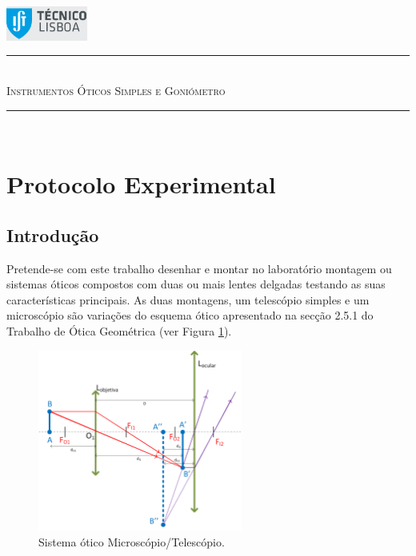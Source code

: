 \documentclass[a4paper,12pt]{article}      %
\author{Prof. Bernardo B. Carvalho}
\date{ Outubro 2012}
\newcommand{\HRule}{\rule{\linewidth}{0.5mm}}
\begin{document}
 

	\includegraphics[width=0.2\textwidth]{../logo-ist}%

	\HRule \\[0.5cm]
	{ \huge \sf  \textsc{Instrumentos Óticos Simples e Goniómetro}} \\[0.4cm] %
	\HRule \\%

\section{\sf Protocolo Experimental}
\subsection{\sf Introdução}
Pretende-se com este trabalho desenhar e montar no laboratório montagem ou sistemas óticos compostos com duas ou mais lentes delgadas testando as suas características principais. As duas montagens, um telescópio simples e um microscópio são variações do esquema ótico apresentado na secção 2.5.1 do Trabalho de Ótica Geométrica (ver Figura \ref{fig:Telescopio}). 

\begin{figure}
	[!htb]  \centering 
	\includegraphics[width=0.6\textwidth]{Telescopio}
	\caption{Sistema ótico Microscópio/Telescópio. \label{fig:Telescopio}} 
\end{figure}
\end{document}
